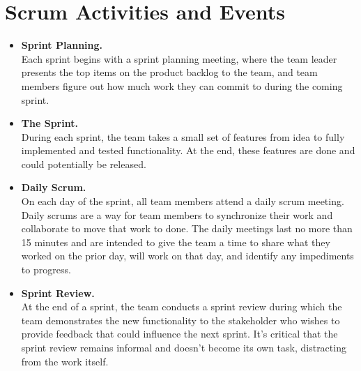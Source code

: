 \section{Scrum Activities and Events}
\begin{itemize}
	\item \textbf{Sprint Planning.}  \hfill \vspace{0.2cm} \\
	Each sprint begins with a sprint planning meeting, where the team leader presents the top items on the product backlog to the team, and team members figure out how much work they can commit to during the coming sprint.
	
	\item \textbf{The Sprint.} \hfill \vspace{0.2cm} \\
	During each sprint, the team takes a small set of features from idea to fully implemented and tested functionality. At the end, these features are done and could potentially be released.
	
	\item \textbf{Daily Scrum.} \hfill \vspace{0.2cm} \\
	On each day of the sprint, all team members attend a daily scrum meeting. Daily scrums are a way for team members to synchronize their work and collaborate to move that work to done. The daily meetings last no more than 15 minutes and are intended to give the team a time to share what they worked on the prior day, will work on that day, and identify any impediments to progress.
	
	\item  \textbf{Sprint Review.}  \hfill \vspace{0.2cm} \\
	At the end of a sprint, the team conducts a sprint review during which the team demonstrates the new functionality to the stakeholder who wishes to provide feedback that could influence the next sprint. It's critical that the sprint review remains informal and doesn't become its own task, distracting from the work itself.
\end{itemize}

